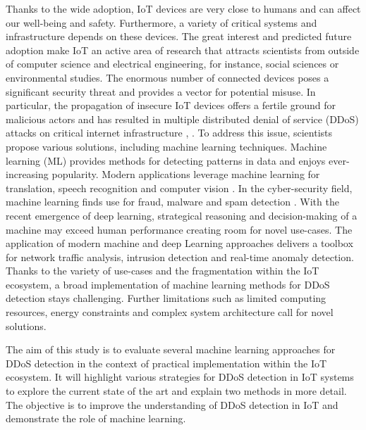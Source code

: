 \documentclass[conference, 11pt]{IEEEtran}
\begin{document}
    Thanks to the wide adoption, IoT devices are very close to humans and can affect our well-being and safety.
    Furthermore, a variety of critical systems and infrastructure depends on these devices.
    The great interest and predicted future adoption make IoT an active area of research that attracts scientists from outside of computer science and electrical engineering, for instance, social sciences or environmental studies.
    The enormous number of connected devices poses a significant security threat and provides a vector for potential misuse.
    In particular, the propagation of insecure IoT devices offers a fertile ground for malicious actors and has resulted in multiple distributed denial of service (DDoS) attacks on critical internet infrastructure \cite{article:16}, \cite{article:8}.
    To address this issue, scientists propose various solutions, including machine learning techniques.
    Machine learning (ML) provides methods for detecting patterns in data and enjoys ever-increasing popularity.
    Modern applications leverage machine learning for translation, speech recognition and computer vision \cite{Goodfellow-et-al-2016}.
    In the cyber-security field, machine learning finds use for fraud, malware and spam detection \cite{article:18}.
    With the recent emergence of deep learning, strategical reasoning and decision-making of a machine may exceed human performance creating room for novel use-cases.
    The application of modern machine and deep Learning approaches delivers a toolbox for network traffic analysis, intrusion detection and real-time anomaly detection.
    Thanks to the variety of use-cases and the fragmentation within the IoT ecosystem, a broad implementation of machine learning methods for DDoS detection stays challenging.
    Further limitations such as limited computing resources, energy constraints and complex system architecture call for novel solutions.

    The aim of this study is to evaluate several machine learning approaches for DDoS detection in the context of practical implementation within the IoT ecosystem.
    It will highlight various strategies for DDoS detection in IoT systems to explore the current state of the art and explain two methods in more detail.
    The objective is to improve the understanding of DDoS detection in IoT and demonstrate the role of machine learning.
\end{document}
